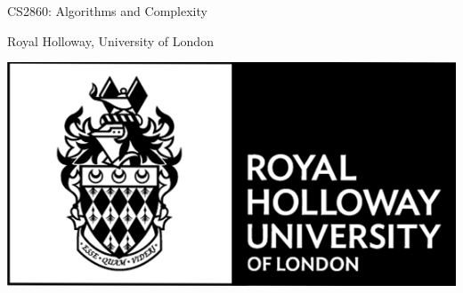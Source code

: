 \begin{titlepage}
	\maketitle
	
	\vfill	
	
	\begin{center}
		CS2860: Algorithms and Complexity\\
 		
 		\vspace{0.4cm}
 		
 		Royal Holloway, University of London\\

 		\vspace{0.8cm}	

 		\begin{center}
 			\includegraphics[scale=1]{./images/root/university.png}
 		\end{center}
 
 	\end{center}
	
	\thispagestyle{empty}
\end{titlepage}
